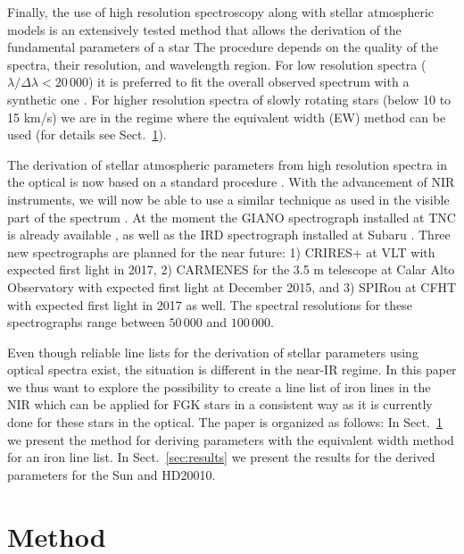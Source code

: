 \documentclass{aa}
\begin{document}
Finally, the use of high resolution spectroscopy along with stellar
atmospheric models is an extensively tested method that allows
the derivation of the fundamental parameters of a star \citep[see
e.g.][]{Santos13} The procedure depends on the quality of the spectra,
their resolution, and wavelength region. For low resolution spectra
($\lambda/\Delta\lambda < 20\,000$) it is preferred to fit the overall
observed spectrum with a synthetic one \citep[see e.g.][]{Recio2006}.
For higher resolution spectra of slowly rotating stars (below 10 to 15
\si{km/s}) we are in the regime where the equivalent width (EW) method
can be used (for details see Sect.~\ref{sec:method}).

The derivation of stellar atmospheric parameters from high
resolution spectra in the optical is now based on a standard
procedure \citep[see e.g.][]{Valenti2005,Sousa2008a}. With the
advancement of NIR instruments, we will now be able to use a similar
technique as used in the visible part of the spectrum \citep[see
e.g.][]{Melendez1999,Tsantaki2013,Sousa2008a,Bensby2014,Mucciarelli2013}
. At the moment the GIANO spectrograph installed at TNC is already
available \citep{GIANO}, as well as the IRD spectrograph installed at
Subaru \citep{IRD}. Three new spectrographs are planned for the near
future: 1) CRIRES+ at VLT \citep{CRIRESp} with expected first light in
2017, 2) CARMENES for the 3.5 m telescope at Calar Alto Observatory
\citep{CARMENES} with expected first light at December 2015, and 3)
SPIRou at CFHT \citep{SPIROU1,SPIROU2} with expected first light in 2017
as well. The spectral resolutions for these spectrographs range between
$50\,000$ and $100\,000$.

Even though reliable line lists for the derivation of stellar parameters
using optical spectra exist, the situation is different in the near-IR
regime. In this paper we thus want to explore the possibility to create
a line list of iron lines in the NIR which can be applied for FGK stars
in a consistent way as it is currently done for these stars in the
optical. The paper is organized as follows: In Sect.~\ref{sec:method}
we present the method for deriving parameters with the equivalent width
method for an iron line list. In Sect.~\ref{sec:results} we present the
results for the derived parameters for the Sun and HD20010.




\section{Method}
\label{sec:method}
\end{document}
